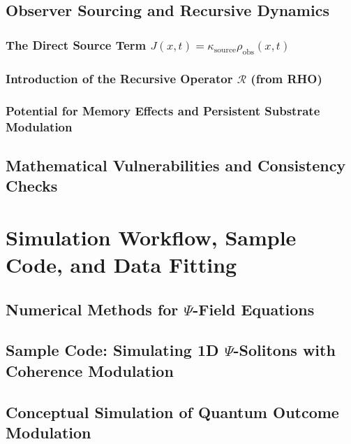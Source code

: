 \documentclass{report}
\begin{document}
    \section{Observer Sourcing and Recursive Dynamics}
    \label{app_sec:observer_sourcing_recursive_dynamics}
        \subsection{The Direct Source Term $J(x,t) = \kappa_{\text{source}}\rho_{\text{obs}}(x,t)$}
        \label{app_subsec:direct_source_term_J}
        \subsection{Introduction of the Recursive Operator $\mathcal{R}$ (from RHO)}
        \label{app_subsec:intro_recursive_operator_R}
        \subsection{Potential for Memory Effects and Persistent Substrate Modulation}
        \label{app_subsec:potential_memory_effects}
    
    \section{Mathematical Vulnerabilities and Consistency Checks}
    \label{app_sec:math_vulnerabilities_consistency}

\chapter{Simulation Workflow, Sample Code, and Data Fitting}
\label{app:simulation_workflow}
    \section{Numerical Methods for $\Psi$-Field Equations}
    \label{app_sec:numerical_methods_psi_eqns}
    \section{Sample Code: Simulating 1D $\Psi$-Solitons with Coherence Modulation}
    \label{app_sec:sample_code_1d_psi_solitons}
    \section{Conceptual Simulation of Quantum Outcome Modulation}
    \label{app_sec:conceptual_sim_quantum_outcome}
\end{document}
